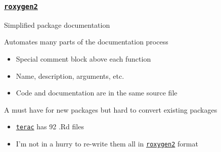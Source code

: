 \documentclass[12 pt]{beamer}\usepackage[]{graphicx}\usepackage[]{color}
\newcommand{\pkg}[1]{{\fontseries{b}\selectfont #1}}
\renewcommand{\pkg}[1]{{\color{darkgreen}\texttt{#1}}}
\begin{document}
  \begin{frame}[fragile]
\frametitle{\href{http://cran.r-project.org/web/packages/roxygen2/index.html}{\pkg{roxygen2}}}

Simplified package documentation

\vspace{.2in}

Automates many parts of the documentation process
\begin{itemize}
\item  Special comment block above each function
\item Name, description, arguments, etc.
\item Code and documentation are in the same source file
\end{itemize}

\vspace{.2in}

A must have for new packages but hard to convert existing packages
\begin{itemize}
\item   \href{http://cran.r-project.org/web/packages/terac/index.html}{\pkg{terac}} has 92 .Rd files
\item I'm not in a hurry to re-write them all in \href{http://cran.r-project.org/web/packages/roxygen2/index.html}{\pkg{roxygen2}} format
\end{itemize}




\end{frame}
\end{document}
